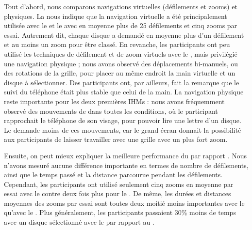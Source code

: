 Tout d'abord, nous comparons navigations virtuelles (défilements et zooms) et physiques. La  nous indique que la navigation virtuelle a été principalement utilisée avec le  et le avec en moyenne plus de 25 défilements et cinq zooms par essai. Autrement dit, chaque disque a demandé en moyenne plus d'un défilement et au moins un zoom pour être classé. En revanche, les participants ont peu utilisé les techniques de défilement et de zoom virtuels avec le , mais privilégié une navigation physique  ; nous avons observé des déplacements bi-manuels, ou des rotations de la grille, pour placer au même endroit la main virtuelle et un disque à sélectionner. Des participants ont, par ailleurs, fait la remarque que le suivi du téléphone était plus stable que celui de la main. La navigation physique reste importante pour les deux premières IHMs  : nous avons fréquemment observé des mouvements de  dans toutes les conditions, où le participant rapprochait le téléphone de son visage, pour pouvoir lire une lettre d'un disque. Le  demande moins de ces mouvements, car le grand écran donnait la possibilité aux participants de laisser travailler avec une grille avec un plus fort zoom.

Ensuite, on peut mieux expliquer la meilleure performance du  par rapport . Nous n'avons mesuré aucune différence importante en termes de nombre de défilements, ainsi que le temps passé  et la distance parcourue pendant les défilements. Cependant, les participants ont utilisé seulement cinq zooms en moyenne par essai avec le  contre deux fois plus pour le . De même, les durées et distances moyennes des zooms par essai  sont toutes deux moitié moins importantes avec le  qu'avec le . Plus généralement, les participants passaient 30\% moins de temps avec un disque sélectionné avec le  par rapport au  .


